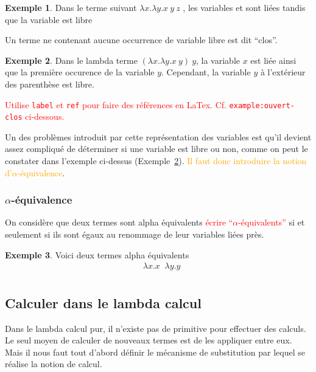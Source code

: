 \documentclass {article}
\theoremstyle{definition}
\newtheorem{example}{Exemple}
\theoremstyle{remark}
\newcommand{\todo}[1]{\textcolor{red}{#1}}
\newcommand{\attention}[1]{\textcolor{orange}{#1}}
\begin{document}
\begin{example}
  Dans le terme suivant \(\lambda x.\lambda y.x\:y\:z\) , les variables  et 
   sont liées tandis que la variable  est libre 
\end{example}


Un terme ne contenant aucune occurrence de variable libre est dit ``clos''.
\begin{example}
  \label{example:ouvert-clos}
  Dans le lambda terme \((\lambda x. \lambda y. x\: y)\: y\), la
  variable \(x\) est liée ainsi que la première occurence de la
  variable \(y\). Cependant, la variable \(y\) à l'extérieur des
  parenthèse est libre.
\end{example}

\todo{Utilise \texttt{label} et \texttt{ref} pour faire des références
  en LaTex. Cf. \texttt{example:ouvert-clos} ci-dessous.}

Un des problèmes introduit par cette représentation des variables est qu'il devient assez compliqué de déterminer si une variable est libre ou non, comme on peut le constater dans l'exemple ci-dessus (Exemple~\ref{example:ouvert-clos}). \attention{Il faut donc introduire la notion d'\(\alpha\)-équivalence}.

\subsubsection{$\alpha$-équivalence}

\newcommand{\equivAlpha}{\mathop{\equiv_\alpha}}

On considère que deux termes sont alpha équivalents \todo{écrire ``\(\alpha\)-équivalents''} si et seulement si ils sont 
égaux au renommage de leur variables liées près. 
\begin{example}
  Voici deux termes alpha équivalents 
  \begin{align*}
    & \lambda x.x \equivAlpha \lambda y.y \\
  \end{align*}
\end{example}
  
\subsection{Calculer dans le lambda calcul}

Dans le lambda calcul pur, il n'existe pas de primitive pour effectuer des 
calculs. Le seul moyen de calculer de nouveaux termes est de les appliquer 
entre eux. Mais il nous faut tout d'abord définir le mécanisme de substitution par lequel se réalise la notion de calcul.
\end{document}
